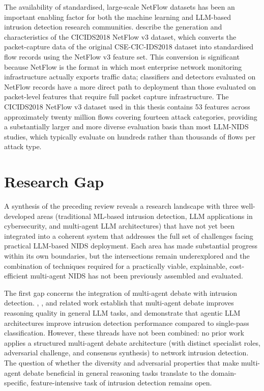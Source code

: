 The availability of standardised, large-scale NetFlow datasets has been an important enabling factor for both the machine learning and LLM-based intrusion detection research communities. \textcite{Sarhan2021} describe the generation and characteristics of the CICIDS2018 NetFlow v3 dataset, which converts the packet-capture data of the original CSE-CIC-IDS2018 dataset into standardised flow records using the NetFlow v3 feature set. This conversion is significant because NetFlow is the format in which most enterprise network monitoring infrastructure actually exports traffic data; classifiers and detectors evaluated on NetFlow records have a more direct path to deployment than those evaluated on packet-level features that require full packet capture infrastructure. The CICIDS2018 NetFlow v3 dataset used in this thesis contains 53 features across approximately twenty million flows covering fourteen attack categories, providing a substantially larger and more diverse evaluation basis than most LLM-NIDS studies, which typically evaluate on hundreds rather than thousands of flows per attack type.

\section{Research Gap}
\label{sec:research-gap}

A synthesis of the preceding review reveals a research landscape with three well-developed areas (traditional ML-based intrusion detection, LLM applications in cybersecurity, and multi-agent LLM architectures) that have not yet been integrated into a coherent system that addresses the full set of challenges facing practical LLM-based NIDS deployment. Each area has made substantial progress within its own boundaries, but the intersections remain underexplored and the combination of techniques required for a practically viable, explainable, cost-efficient multi-agent NIDS has not been previously assembled and evaluated.

The first gap concerns the integration of multi-agent debate with intrusion detection. \textcite{Du2023}, \textcite{Chan2023}, and related work establish that multi-agent debate improves reasoning quality in general LLM tasks, and \textcite{Li2024} demonstrate that agentic LLM architectures improve intrusion detection performance compared to single-pass classification. However, these threads have not been combined: no prior work applies a structured multi-agent debate architecture (with distinct specialist roles, adversarial challenge, and consensus synthesis) to network intrusion detection. The question of whether the diversity and adversarial properties that make multi-agent debate beneficial in general reasoning tasks translate to the domain-specific, feature-intensive task of intrusion detection remains open.

